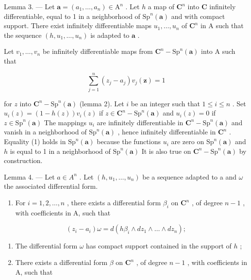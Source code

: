 Lemma 3. --- Let \(\boldsymbol{a} = (a_{1},\ldots ,a_{n})\in \mathrm{A}^{n}\) . Let \(h\) a map of \(\mathbf{C}^n\) into \(\mathbf{C}\) infinitely differentiable, equal to 1 in a neighborhood of \(\mathrm{Sp}^n (\boldsymbol {a})\) and with compact support. There exist infinitely differentiable maps \(u_{1},\ldots ,u_{n}\) of \(\mathbf{C}^n\) in A such that the sequence \((h,u_1,\dots,u_n)\) is adapted to \(\boldsymbol{a}\) .

Let \(v_{1},\ldots,v_{n}\) be infinitely differentiable maps from \(\mathbf{C}^{n}-\mathrm{Sp}^{n}(\boldsymbol{a})\) into A such that

\[
\sum_ {j = 1} ^ {n} (z _ {j} - a _ {j}) v _ {j} (\boldsymbol {z}) = 1
\]

for \(z\) into \(\mathbf{C}^n - \mathrm{Sp}^n(\boldsymbol{a})\) (lemma 2). Let \(i\) be an integer such that \(1 \leqslant i \leqslant n\) . Set \(u_i(z) = (1 - h(z))v_i(z)\) if \(z \in \mathbf{C}^n - \mathrm{Sp}^n(\boldsymbol{a})\) and \(u_i(z) = 0\) if \(z \in \mathrm{Sp}^n(\boldsymbol{a})\) The mappings \(u_i\) are infinitely differentiable in \(\mathbf{C}^n - \mathrm{Sp}^n(\boldsymbol{a})\) and vanish in a neighborhood of \(\mathrm{Sp}^n(\boldsymbol{a})\) , hence infinitely differentiable in \(\mathbf{C}^n\) . Equality (1) holds in \(\mathrm{Sp}^n(\boldsymbol{a})\) because the functions \(u_i\) are zero on \(\mathrm{Sp}^n(\boldsymbol{a})\) and \(h\) is equal to 1 in a neighborhood of \(\mathrm{Sp}^n(\boldsymbol{a})\) It is also true on \(\mathbf{C}^n - \mathrm{Sp}^n(\boldsymbol{a})\) by construction.

Lemma 4. — Let \(a \in A^{n}\) . Let \((h, u_{1}, \ldots, u_{n})\) be a sequence adapted to a and \(\omega\) the associated differential form.

\begin{enumerate}
\def\labelenumi{\alph{enumi})}
\tightlist
\item
  For \(i = 1,2,\ldots,n\) , there exists a differential form \(\beta_{i}\) on \(\mathbf{C}^{n}\) , of degree \(n - 1\) , with coefficients in A, such that
\end{enumerate}

\[
(z _ {i} - a _ {i}) \omega = d (h \beta_ {i} \wedge d z _ {1} \wedge \dots \wedge d z _ {n});
\]

\begin{enumerate}
\def\labelenumi{\alph{enumi})}
\setcounter{enumi}{1}
\item
  The differential form \(\omega\) has compact support contained in the support of \(h\) ;
\item
  There exists a differential form \(\beta\) on \(\mathbf{C}^{n}\) , of degree \(n - 1\) , with coefficients in A, such that
\end{enumerate}

